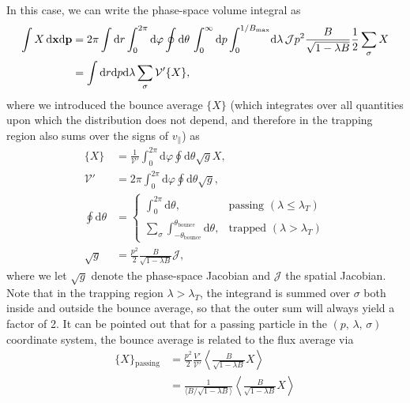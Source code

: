 \documentclass[11pt,a4paper]{article}
\newcommand{\rd}{\ensuremath{\mathrm{d}}}
\newcommand{\sub}[1]{\ensuremath{_{\text{#1}}}}
\renewcommand{\b}[1]{\ensuremath{ {\bf #1 } }}
\begin{document}
In this case, we can write the phase-space volume integral as
\begin{align}
\int X \,\rd\b{x} \rd\b{p} &= 2\pi \int \rd r \int_0^{2\pi} \rd \varphi \oint \rd \theta \, \int_0^\infty \rd p \int_0^{1/B\sub{max}} \!\rd \lambda \, \mathcal{J}p^2\frac{B}{\sqrt{1-\lambda B}}\frac{1}{2}\sum_\sigma X \nonumber \\
&= \int \rd r \rd p \rd \lambda \sum_\sigma \mathcal{V}' \{ X \},
\end{align}
where we introduced the bounce average $\{X\}$ (which integrates over all quantities upon which the distribution does not depend, and therefore in the trapping region also sums over the signs of $v_\parallel$) as
\begin{align}
\{ X\} &= \frac{1}{\mathcal{V}'} \int_0^{2\pi} \rd \varphi \oint \rd \theta \sqrt{g}X, \nonumber \\
\mathcal{V}' &= 2\pi \int_0^{2\pi} \rd \varphi \oint \rd \theta \sqrt{g}, \nonumber \\
\oint\rd\theta &= \begin{cases}
\int_0^{2\pi}\rd\theta, & \text{passing }(\lambda \leq \lambda_T)\\
\sum_\sigma \int_{-\theta\sub{bounce}}^{\theta\sub{bounce}} \rd\theta, & \text{trapped } (\lambda > \lambda_T)
\end{cases} \\
\sqrt{g} &= \frac{p^2}{2}\frac{B}{\sqrt{1-\lambda B}}\mathcal{J} ,
\end{align}
where we let $\sqrt{g}$ denote the phase-space Jacobian and $\mathcal{J}$ the spatial Jacobian. Note that in the trapping region $\lambda > \lambda_T$, the integrand is summed over $\sigma$ both inside and outside the bounce average, so that the outer sum will always yield a factor of 2.
It can be pointed out that for a passing particle in the $(p,\,\lambda,\,\sigma)$ coordinate system, the bounce average is related to the flux average via 
\begin{align}
\{X\}\sub{passing} &= \frac{p^2}{2}\frac{V'}{\mathcal{V}'}\left\langle \frac{B}{\sqrt{1-\lambda B}}X\right\rangle \nonumber \\
&= \frac{1}{\langle B/\sqrt{1-\lambda B} \rangle}\left\langle \frac{B}{\sqrt{1-\lambda B}}X\right\rangle 
\end{align}
\end{document}
